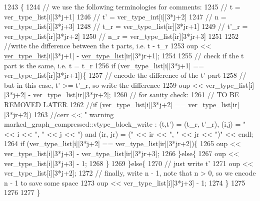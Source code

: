 \begin{DoxyCode}
1243                                                                                             \{
1244   \textcolor{comment}{// we use the following terminologies for comments:}
1245   \textcolor{comment}{// t = ver\_type\_list[i][3*j+1]}
1246   \textcolor{comment}{// t' = ver\_type\_int[i][3*j+2]}
1247   \textcolor{comment}{// n = ver\_type\_list[i][3*j+3]}
1248   \textcolor{comment}{// t\_r = ver\_type\_list[ir][3*jr+1]}
1249   \textcolor{comment}{// t'\_r = ver\_type\_list[ir][3*jr+2]}
1250   \textcolor{comment}{// n\_r = ver\_type\_list[ir][3*jr+3]}
1251 
1252   \textcolor{comment}{//write the difference between the t parts, i.e. t - t\_r}
1253   oup << \hyperlink{classmarked__graph__compressed_af2e3e55223d436628a02758dfae88493}{ver\_type\_list}[i][3*j+1] - \hyperlink{classmarked__graph__compressed_af2e3e55223d436628a02758dfae88493}{ver\_type\_list}[ir][3*jr+1];
1254 
1255   \textcolor{comment}{// check if the t part is the same, i.e. t = t\_r}
1256   \textcolor{keywordflow}{if} (ver\_type\_list[i][3*j+1] == ver\_type\_list[ir][3*jr+1])\{
1257     \textcolor{comment}{// encode the difference of the t' part}
1258     \textcolor{comment}{// but in this case, t' >= t'\_r, so write the difference}
1259     oup << ver\_type\_list[i][3*j+2] - ver\_type\_list[ir][3*jr+2];
1260     \textcolor{comment}{// for sanity check:}
1261     \textcolor{comment}{// TO BE REMOVED LATER}
1262     \textcolor{comment}{//if (ver\_type\_list[i][3*j+2] == ver\_type\_list[ir][3*jr+2])}
1263     \textcolor{comment}{//cerr << " warning marked\_graph\_compressed::vtype\_block\_write : (t,t') = (t\_r, t'\_r), (i,j) = " << i
       << ", " << j << ") and (ir, jr) = (" << ir << ", " << jr << ")" << endl;}
1264     \textcolor{keywordflow}{if} (ver\_type\_list[i][3*j+2] == ver\_type\_list[ir][3*jr+2])\{
1265       oup << ver\_type\_list[i][3*j+3] - ver\_type\_list[ir][3*jr+3];
1266     \}\textcolor{keywordflow}{else}\{
1267       oup << ver\_type\_list[i][3*j+3] - 1;
1268     \}
1269   \}\textcolor{keywordflow}{else}\{
1270     \textcolor{comment}{// just write t'}
1271     oup << ver\_type\_list[i][3*j+2];
1272     \textcolor{comment}{// finally, write n - 1, note that n > 0, so we encode n - 1 to save some space}
1273     oup << ver\_type\_list[i][3*j+3] - 1;
1274   \}
1275 
1276   
1277 \}
\end{DoxyCode}
\mbox{\label{classmarked__graph__compressed_af29f16cbd56583652118eb24a7c233b7}} 
